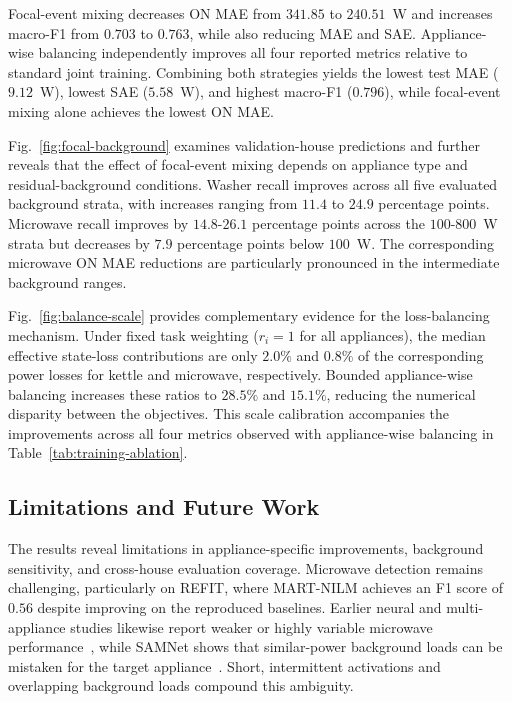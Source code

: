 \documentclass[journal]{IEEEtran}
\begin{document}
Focal-event mixing decreases ON MAE from $341.85$ to $240.51$~W and increases macro-F1 from $0.703$ to $0.763$, while also reducing MAE and SAE. Appliance-wise balancing independently improves all four reported metrics relative to standard joint training. Combining both strategies yields the lowest test MAE ($9.12$~W), lowest SAE ($5.58$~W), and highest macro-F1 ($0.796$), while focal-event mixing alone achieves the lowest ON MAE.



Fig.~\ref{fig:focal-background} examines validation-house predictions and further reveals that the effect of focal-event mixing depends on appliance type and residual-background conditions. Washer recall improves across all five evaluated background strata, with increases ranging from $11.4$ to $24.9$ percentage points. Microwave recall improves by $14.8$-$26.1$ percentage points across the $100$-$800$~W strata but decreases by $7.9$ percentage points below $100$~W. The corresponding microwave ON MAE reductions are particularly pronounced in the intermediate background ranges.



Fig.~\ref{fig:balance-scale} provides complementary evidence for the loss-balancing mechanism. Under fixed task weighting ($r_i=1$ for all appliances), the median effective state-loss contributions are only $2.0\%$ and $0.8\%$ of the corresponding power losses for kettle and microwave, respectively. Bounded appliance-wise balancing increases these ratios to $28.5\%$ and $15.1\%$, reducing the numerical disparity between the objectives. This scale calibration accompanies the improvements across all four metrics observed with appliance-wise balancing in Table~\ref{tab:training-ablation}.

\subsection{Limitations and Future Work}

The results reveal limitations in appliance-specific improvements, background sensitivity, and cross-house evaluation coverage. Microwave detection remains challenging, particularly on REFIT, where MART-NILM achieves an F1 score of $0.56$ despite improving on the reproduced baselines. Earlier neural and multi-appliance studies likewise report weaker or highly variable microwave performance~\cite{kelly2015neural,faustine2020unet,xiong2024matnilm}, while SAMNet shows that similar-power background loads can be mistaken for the target appliance~\cite{liu2022samnet}. Short, intermittent activations and overlapping background loads compound this ambiguity.
\end{document}
